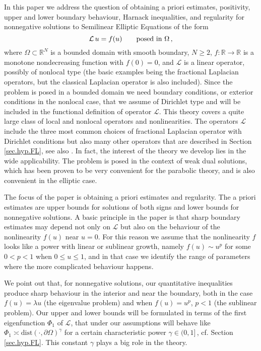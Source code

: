 \documentclass[11pt]{article}
\numberwithin{equation}{section}
\newcommand{\A}{\mathcal{L}}
\newcommand{\RR}{\mathbb{R}}
\def\dist{\mathrm{dist}} %
\begin{document}
In this paper we address the question of obtaining a priori estimates, positivity, upper and lower boundary behaviour, Harnack inequalities, and regularity for nonnegative solutions to Semilinear Elliptic Equations of the form\vspace{-1mm}
\begin{equation}\label{FPME.equation}
\A\,u=f(u)  \qquad\mbox{posed in } \Omega\,,\vspace{-1mm}
\end{equation}
where $\Omega\subset \RR^N$ is a bounded domain with smooth boundary, $N\ge 2$,  $f:\RR \to \RR$ is a monotone nondecreasing function with $f(0)=0$, and $\A$ is a linear operator, possibly of nonlocal type (the basic examples being the fractional Laplacian operators, but the classical Laplacian operator is also included).  Since the problem is posed in a bounded domain we need boundary conditions, or exterior  conditions in the nonlocal case,   that we assume of Dirichlet type and will be included in the functional definition of operator $\A$. This theory covers a quite large class of local and nonlocal operators and nonlinearities.  The operators  $\A$ include the three most common choices of fractional Laplacian operator with Dirichlet conditions but also many other operators  that  are described in Section \ref{sec.hyp.FL}, see  also \cite{BV-PPR2-1, BFV-Parabolic}. In fact, the interest of the theory we develop lies in the wide applicability. The problem is posed in the context of weak dual solutions, which has been proven to be very convenient for the parabolic theory, and is also convenient in the elliptic case.

The focus of the paper is obtaining  a priori estimates and regularity. The a priori estimates are upper bounds for solutions of both signs and lower bounds for nonnegative solutions.    A basic principle in
the paper is that  sharp boundary estimates may   depend not only on $\A$ but also on the behaviour of the nonlinearity $f(u)$ near $u=0$. For this reason we  assume that the nonlinearity $f$ looks like a power with linear or sublinear growth, namely $f(u)\sim u^p$ for some $0<p<1$ when $0\le u\le 1$,   and in that case we identify the range of parameters where the more complicated behaviour happens.

We point out that, for nonnegative solutions, our quantitative inequalities produce sharp behaviour in the interior and near the boundary, both in the case $f(u)=\lambda u$ (the eigenvalue problem) and when $f(u)=u^p$, $p<1$ (the sublinear problem). Our upper and lower bounds will be formulated in terms of the first eigenfunction $\Phi_1$ of $\A$, that under our assumptions will behave like $\Phi_1\asymp  \dist(\cdot, \partial\Omega)^\gamma$ for a certain characteristic power $\gamma\in (0,1]$\,, cf. Section \ref{sec.hyp.FL}. This constant $\gamma$ plays a big role in the theory.
\end{document}
